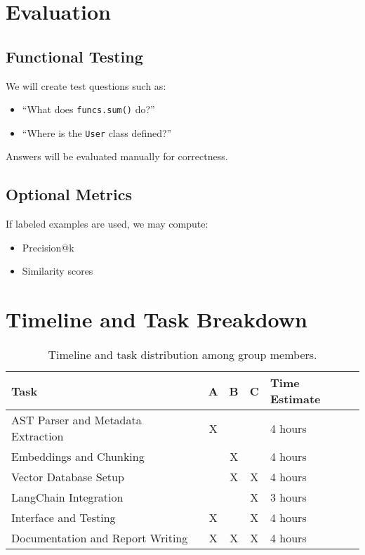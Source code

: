 \documentclass[11pt]{article}
\begin{document}
\section{Evaluation}

\subsection*{Functional Testing}
We will create test questions such as:
\begin{itemize}[noitemsep]
  \item ``What does \texttt{funcs.sum()} do?''
  \item ``Where is the \texttt{User} class defined?''
\end{itemize}
Answers will be evaluated manually for correctness.

\subsection*{Optional Metrics}
If labeled examples are used, we may compute:
\begin{itemize}[noitemsep]
  \item Precision@k
  \item Similarity scores
\end{itemize}

\section{Timeline and Task Breakdown}

\begin{table}[h!]
\centering
\renewcommand{\arraystretch}{1.2}
\begin{tabular}{|p{6cm}|c|c|c|p{2.5cm}|}
\hline
\textbf{Task} & \textbf{A} & \textbf{B} & \textbf{C} & \textbf{Time Estimate} \\
\hline
AST Parser and Metadata Extraction & X & & & 4 hours \\
Embeddings and Chunking            & & X & & 4 hours \\
Vector Database Setup              & & X & X & 4 hours \\
LangChain Integration              & & & X & 3 hours \\
Interface and Testing              & X & & X & 4 hours \\
Documentation and Report Writing   & X & X & X & 4 hours \\
\hline
\end{tabular}
\caption{Timeline and task distribution among group members.}
\end{table}
\end{document}
